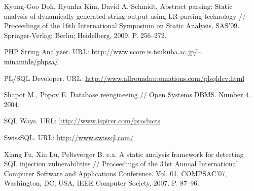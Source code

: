 \documentclass{llncs}
\begin{document}
\begin{thebibliography}{}
Kyung-Goo Doh, Hyunha Kim, David A. Schmidt. Abstract parsing: Static analysis of dynamically generated string output using LR-parsing technology // Proceedings of the 16th International Symposium on Static Analysis, SAS’09. Springer-Verlag: Berlin; Heidelberg, 2009. P. 256–272.

PHP String Analyzer. URL: \href{http://www.score.is.tsukuba.ac.jp/~minamide/phpsa/}{http://www.score.is.tsukuba.ac.jp/$\sim$minamide/phpsa/}

PL/SQL Developer. URL: \href{http://www.allroundautomations.com/plsqldev.html}{http://www.allroundautomations.com/plsqldev.html}

Shapot M., Popov E. Database reengineeing // Open Systems.DBMS. Number 4. 2004.    

SQL Ways. URL: \href{http://www.ispirer.com/products}{http://www.ispirer.com/products}

SwissSQL. URL: \href{http://www.swissql.com/}{http://www.swissql.com/}

Xiang Fu, Xin Lu, Peltsverger B. e.a. A static analysis framework for detecting SQL injection vulnerabilities // Proceedings of the 31st Annual International Computer Software and Applications Conference. Vol. 01, COMPSAC’07, Washington, DC, USA, IEEE Computer Society, 2007. P. 87–96.

\end{thebibliography}%
%
\end{document}
